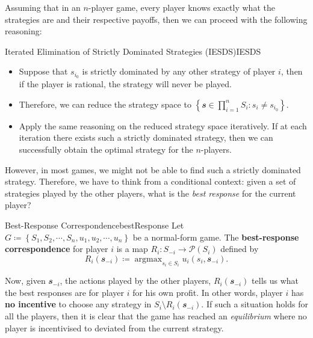 \documentclass[math]{amznotes}
\theoremstyle{remark}
\DeclareMathOperator*{\argmax}{argmax}
\begin{document}
Assuming that in an $n$-player game, every player knows exactly what the strategies are and their respective payoffs, then we can proceed with the following reasoning:
\begin{tecbox}{Iterated Elimination of Strictly Dominated Strategies (IESDS)}{IESDS}
    \begin{itemize}
        \item Suppose that $s_{i_0}$ is strictly dominated by any other strategy of player $i$, then if the player is rational, the strategy will never be played.
        \item Therefore, we can reduce the strategy space to $\left\{\mathbfit{s} \in \prod_{i = 1}^nS_i \colon s_i \neq s_{i_0}\right\}$.
        \item Apply the same reasoning on the reduced strategy space iteratively. If at each iteration there exists such a strictly dominated strategy, then we can successfully obtain the optimal strategy for the $n$-players.
    \end{itemize}
\end{tecbox}
However, in most games, we might not be able to find such a strictly dominated strategy. Therefore, we have to think from a conditional context: given a set of strategies played by the other players, what is the \textit{best response} for the current player?
\begin{dfnbox}{Best-Response Correspondence}{bestResponse}
    Let $G \coloneqq \left\{S_1, S_2, \cdots, S_n, u_1, u_2, \cdots, u_n\right\}$ be a normal-form game. The {\color{red} \textbf{best-response correspondence}} for player $i$ is a map $R_i \colon S_{-i} \to \mathcal{P}\left(S_i\right)$ defined by 
    \begin{equation*}
        R_i\left(\mathbfit{s}_{-i}\right) \coloneqq \argmax_{s_i \in S_i}u_i\left(s_i, \mathbfit{s}_{-i}\right).
    \end{equation*}
\end{dfnbox}
Now, given $\mathbfit{s}_{-i}$, the actions played by the other players, $R_i\left(\mathbfit{s}_{-i}\right)$ tells us what the best responses are for player $i$ for his own profit. In other words, player $i$ has \textbf{no incentive} to choose any strategy in $S_i \setminus R_i\left(\mathbfit{s}_{-i}\right)$. If such a situation holds for all the players, then it is clear that the game has reached an \textit{equilibrium} where no player is incentivised to deviated from the current strategy.
\end{document}
